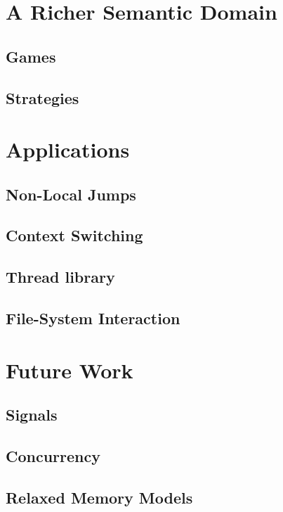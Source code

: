 \documentclass[sigplan,10pt,review,anonymous]{acmart}
\begin{document}


\section{A Richer Semantic Domain} %

\subsection{Games}
\subsection{Strategies}



\section{Applications} %

\subsection{Non-Local Jumps}
\subsection{Context Switching}
\subsection{Thread library}
\subsection{File-System Interaction}


\section{Future Work} %

\subsection{Signals}
\subsection{Concurrency}
\subsection{Relaxed Memory Models}
\end{document}
